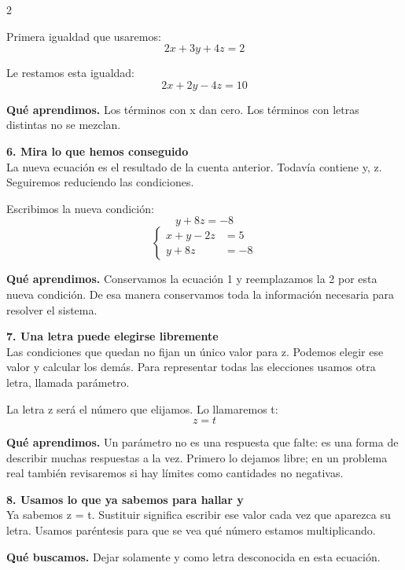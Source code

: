 \documentclass[11pt,a4paper,landscape]{article}
\begin{document}
\begin{multicols*}{2}
\begin{minipage}{\linewidth}
\par\smallskip Primera igualdad que usaremos:
\[2x + 3y + 4z = 2\]
\par\smallskip Le restamos esta igualdad:
\[2x + 2y - 4z = 10\]
\par\smallskip\textbf{Qué aprendimos.} Los términos con x dan cero. Los términos con letras distintas no se mezclan.
\end{minipage}\par\medskip
\noindent\begin{minipage}{\linewidth}\textbf{6. Mira lo que hemos conseguido}\\[2pt]La nueva ecuación es el resultado de la cuenta anterior. Todavía contiene y, z. Seguiremos reduciendo las condiciones.
\par\smallskip Escribimos la nueva condición:
\[y + 8z = -8\]
\[\left\{\begin{aligned}x + y - 2z &= 5\\y + 8z &= -8\end{aligned}\right.\]
\par\smallskip\textbf{Qué aprendimos.} Conservamos la ecuación 1 y reemplazamos la 2 por esta nueva condición. De esa manera conservamos toda la información necesaria para resolver el sistema.
\end{minipage}\par\medskip
\noindent\begin{minipage}{\linewidth}\textbf{7. Una letra puede elegirse libremente}\\[2pt]Las condiciones que quedan no fijan un único valor para z. Podemos elegir ese valor y calcular los demás. Para representar todas las elecciones usamos otra letra, llamada parámetro.
\par\smallskip La letra z será el número que elijamos. Lo llamaremos t:
\[z=t\]
\par\smallskip\textbf{Qué aprendimos.} Un parámetro no es una respuesta que falte: es una forma de describir muchas respuestas a la vez. Primero lo dejamos libre; en un problema real también revisaremos si hay límites como cantidades no negativas.
\end{minipage}\par\medskip
\noindent\begin{minipage}{\linewidth}\textbf{8. Usamos lo que ya sabemos para hallar y}\\[2pt]Ya sabemos z = t. Sustituir significa escribir ese valor cada vez que aparezca su letra. Usamos paréntesis para que se vea qué número estamos multiplicando.
\par\smallskip\textbf{Qué buscamos.} Dejar solamente y como letra desconocida en esta ecuación.

\end{minipage}
\end{multicols*}
\end{document}
